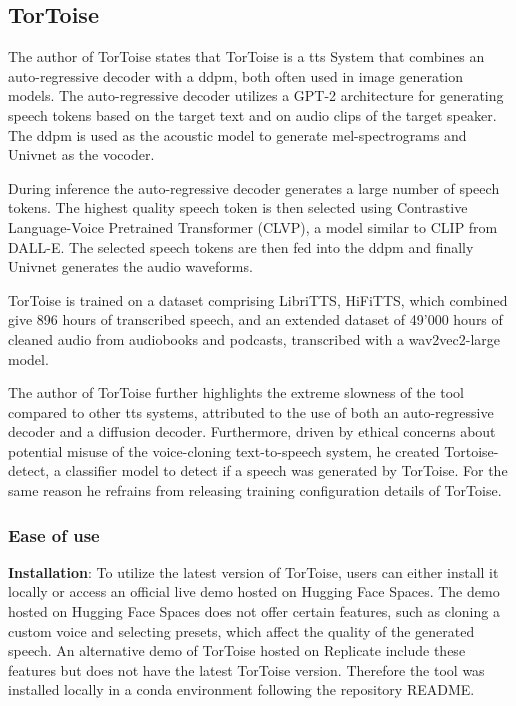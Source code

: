 \subsection{TorToise}
The author of TorToise\cite{betker2023better} states that TorToise is a \gls{tts} System that combines an auto-regressive decoder with a \gls{ddpm}, both often used in image generation models.
The auto-regressive decoder utilizes a GPT-2 architecture for generating speech tokens based on the target text and on audio clips of the target speaker. The \gls{ddpm} is used as the acoustic model to generate mel-spectrograms and Univnet as the vocoder.

During inference the auto-regressive decoder generates a large number of speech tokens. The highest quality speech token is then selected using Contrastive Language-Voice Pretrained Transformer (CLVP), a model similar to CLIP from DALL-E. The selected speech tokens are then fed into the \gls{ddpm} and finally Univnet generates the audio waveforms.

TorToise is trained on a dataset comprising LibriTTS, HiFiTTS, which combined give 896 hours of transcribed speech, and an extended dataset of 49'000 hours of cleaned audio from audiobooks and podcasts, transcribed with a wav2vec2-large model.

The author of TorToise further highlights the extreme slowness of the tool compared to other \gls{tts} systems, attributed to the use of both an auto-regressive decoder and a diffusion decoder.
Furthermore, driven by ethical concerns about potential misuse of the voice-cloning text-to-speech system, he created Tortoise-detect, a classifier model to detect if a speech was generated by TorToise. For the same reason he refrains from releasing training configuration details of TorToise\cite{betker_tortoise_2022}.

\subsubsection{Ease of use}

\textbf{Installation}: To utilize the latest version of TorToise, users can either install it locally or access an  official live demo hosted on Hugging Face Spaces\cite{betker_tortoise_hugging_face}. The demo hosted on Hugging Face Spaces does not offer certain features, such as cloning a custom voice and selecting presets, which affect the quality of the generated speech. An alternative demo of TorToise hosted on Replicate\cite{mullis_afiaka87tortoise-tts_nodate} include these features but does not have the latest TorToise version. Therefore the tool was installed locally in a conda environment following the repository README\cite{betker_tortoise_2022}.

